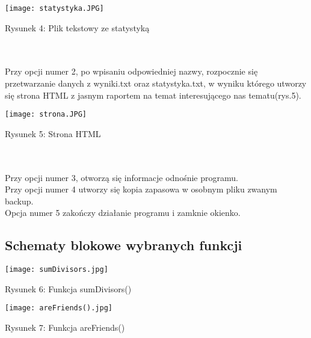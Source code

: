 \documentclass[12pt,a4paper]{article}
\begin{document}
	    \begin{center}
	    \texttt{[image: statystyka.JPG]}
	    \begin{caption}
	    \caption{Rysunek 4: Plik tekstowy ze statystyką}
	    \end{caption}
	    
	    \end{center}
	    
	
	\hspace{10} \\  \\ Przy opcji numer 2, po wpisaniu odpowiedniej nazwy, rozpocznie się przetwarzanie danych z wyniki.txt oraz statystyka.txt, w wyniku którego utworzy się strona HTML z jasnym raportem na temat interesującego nas tematu(rys.5). \\
	
	    \begin{center}
	    \texttt{[image: strona.JPG]}
	    \begin{caption}
	    \caption{Rysunek 5: Strona HTML}
	    \end{caption}
	    \end{center}
	    
	
	\hspace{10}\\ \\ Przy opcji numer 3, otworzą się informacje odnośnie programu. \\ Przy opcji numer 4 utworzy się kopia zapasowa w osobnym pliku zwanym backup. \\ Opcja numer 5 zakończy działanie programu i zamknie okienko.
	
	\newpage
	\subsection{Schematy blokowe wybranych funkcji} 
	
	
	    \begin{center}
	    \texttt{[image: sumDivisors.jpg]}
	    \newline \newline
	    \begin{caption}
	    \caption{Rysunek 6: Funkcja sumDivisors()}
	    \end{caption}
	    
	    \end{center}
	    
	    
	\newpage
	
	    \begin{center}
	    \texttt{[image: areFriends().jpg]}
	    \newline \newline
	    \begin{caption}
	    \caption{Rysunek 7: Funkcja areFriends()}
	    \end{caption}
	    \end{center}
	    
\end{document}
